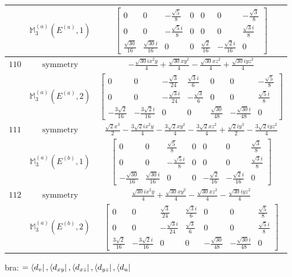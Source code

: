 \documentclass[fleqn,8pt,landscape]{jsarticle}
\begin{document}
\begin{longtable}{ccc}
$  $ & $ \mathbb{M}_{3}^{(a)}(E^{(a)},1) $ & $ \begin{bmatrix} 0 & 0 & - \frac{\sqrt{5}}{8} & 0 & 0 & 0 & - \frac{\sqrt{3}}{8} \\ 0 & 0 & - \frac{\sqrt{5} i}{8} & 0 & 0 & 0 & \frac{\sqrt{3} i}{8} \\ \frac{\sqrt{30}}{16} & \frac{\sqrt{30} i}{16} & 0 & 0 & \frac{\sqrt{2}}{16} & - \frac{\sqrt{2} i}{16} & 0 \end{bmatrix} $ \\ \hline
$ 110 $ & $ \text{symmetry} $ & $ - \frac{\sqrt{30} i x^{2} y}{4} + \frac{\sqrt{30} x y^{2}}{4} - \frac{\sqrt{30} x z^{2}}{4} + \frac{\sqrt{30} i y z^{2}}{4} $ \\
$  $ & $ \mathbb{M}_{3}^{(a)}(E^{(a)},2) $ & $ \begin{bmatrix} 0 & 0 & - \frac{\sqrt{3}}{24} & \frac{\sqrt{3} i}{6} & 0 & 0 & - \frac{\sqrt{5}}{8} \\ 0 & 0 & - \frac{\sqrt{3} i}{24} & - \frac{\sqrt{3}}{6} & 0 & 0 & \frac{\sqrt{5} i}{8} \\ - \frac{3 \sqrt{2}}{16} & - \frac{3 \sqrt{2} i}{16} & 0 & 0 & \frac{\sqrt{30}}{48} & - \frac{\sqrt{30} i}{48} & 0 \end{bmatrix} $ \\ \hline
$ 111 $ & $ \text{symmetry} $ & $ \frac{\sqrt{2} x^{3}}{2} - \frac{3 \sqrt{2} i x^{2} y}{4} - \frac{3 \sqrt{2} x y^{2}}{4} - \frac{3 \sqrt{2} x z^{2}}{4} + \frac{\sqrt{2} i y^{3}}{2} - \frac{3 \sqrt{2} i y z^{2}}{4} $ \\
$  $ & $ \mathbb{M}_{3}^{(a)}(E^{(b)},1) $ & $ \begin{bmatrix} 0 & 0 & \frac{\sqrt{5}}{8} & 0 & 0 & 0 & \frac{\sqrt{3}}{8} \\ 0 & 0 & - \frac{\sqrt{5} i}{8} & 0 & 0 & 0 & \frac{\sqrt{3} i}{8} \\ - \frac{\sqrt{30}}{16} & \frac{\sqrt{30} i}{16} & 0 & 0 & - \frac{\sqrt{2}}{16} & - \frac{\sqrt{2} i}{16} & 0 \end{bmatrix} $ \\ \hline
$ 112 $ & $ \text{symmetry} $ & $ \frac{\sqrt{30} i x^{2} y}{4} + \frac{\sqrt{30} x y^{2}}{4} - \frac{\sqrt{30} x z^{2}}{4} - \frac{\sqrt{30} i y z^{2}}{4} $ \\
$  $ & $ \mathbb{M}_{3}^{(a)}(E^{(b)},2) $ & $ \begin{bmatrix} 0 & 0 & \frac{\sqrt{3}}{24} & \frac{\sqrt{3} i}{6} & 0 & 0 & \frac{\sqrt{5}}{8} \\ 0 & 0 & - \frac{\sqrt{3} i}{24} & \frac{\sqrt{3}}{6} & 0 & 0 & \frac{\sqrt{5} i}{8} \\ \frac{3 \sqrt{2}}{16} & - \frac{3 \sqrt{2} i}{16} & 0 & 0 & - \frac{\sqrt{30}}{48} & - \frac{\sqrt{30} i}{48} & 0 \end{bmatrix} $ \\ \hline
\end{longtable}
bra: $=\bra{d_{v}}, \bra{d_{xy}}, \bra{d_{xz}}, \bra{d_{yz}}, \bra{d_{u}}$
\end{document}
